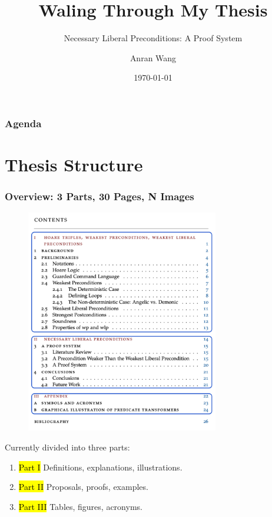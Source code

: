 \documentclass[aspectratio=169]{beamer}
\title{Waling Through My Thesis}
\subtitle{Necessary Liberal Preconditions: A Proof System}
\author{Anran Wang}
\institute{Department of Informatics\\ Technical University of Munich}
\date{\today}
\begin{document}
\begin{frame}
	\titlepage
\end{frame}

\begin{frame}
	\frametitle{Agenda}
	\tableofcontents
\end{frame}

\section{Thesis Structure}
\begin{frame}[fragile]
	\frametitle{Overview: 3 Parts, 30 Pages, N Images}
	\begin{minipage}{0.49\linewidth}	
		\begin{figure}
	    \centering\includegraphics[width=0.75\textwidth]{images/toc-split.png} 
	  \end{figure}
	\end{minipage}
\begin{minipage}{0.49\linewidth}
	Currently divided into three parts: 
		\begin{enumerate}
		    \item[] \hl{Part I} Definitions, explanations, illustrations. 
		    \item[] \hl{Part II} Proposals, proofs, examples. 
		    \item[] \hl{Part III} Tables, figures, acronyms. 
		\end{enumerate}
	\end{minipage}
\end{frame}
\end{document}
